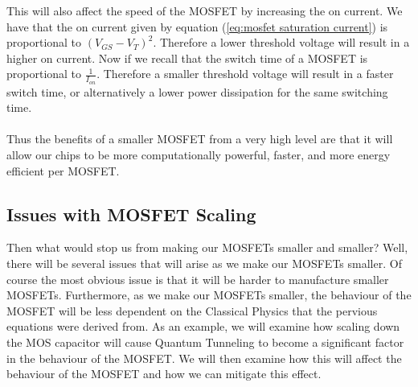 \documentclass[
  reprint,
  amsmath,amssymb,
  aps
]{revtex4-1}
\begin{document}
This will also affect the speed of the MOSFET by increasing the on current. We have that the on current given by 
equation (\ref{eq:mosfet saturation current}) is proportional to $(V_{GS}-V_{T})^{2}$. Therefore a lower threshold voltage will result in 
a higher on current. Now if we recall that the switch time of a MOSFET is proportional to $\frac{1}{I_{on}}$. Therefore 
a smaller threshold voltage will result in a faster switch time, or alternatively a lower power dissipation for the 
same switching time.\\\\
Thus the benefits of a smaller MOSFET from a very high level are that it will allow our chips to be more computationally powerful, 
faster, and more energy efficient per MOSFET. 
\subsection*{Issues with MOSFET Scaling}
Then what would stop us from making our MOSFETs smaller and smaller? Well, there will be several issues that will 
arise as we make our MOSFETs smaller. Of course the most obvious issue is that it will be harder to manufacture smaller MOSFETs. Furthermore, 
as we make our MOSFETs smaller, the behaviour of the MOSFET will be less dependent on the Classical Physics that the pervious 
equations were derived from. As an example, we will examine how scaling down the 
MOS capacitor will cause Quantum Tunneling to become a significant factor in the behaviour of the MOSFET. We will 
then examine how this will affect the behaviour of the MOSFET and how we can mitigate this effect.\\\\
\end{document}
